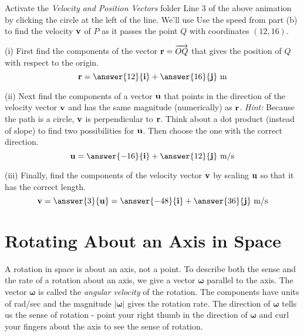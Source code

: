 \documentclass{ximera}
\begin{document}
\begin{question}   \label{Q3456457l:Cross}
Activate the {\it Velocity and Position Vectors} folder Line 3 of the above animation by clicking the circle at the left of the line. We'll use Use the speed from part (b) to find the velocity ${\bf v}$ of $P$ as it passes the point $Q$ with coordinates $(12,16)$.

(i) First find the components of the vector ${\bf r}=\overrightarrow{OQ}$ that gives the position of $Q$ with respect to the origin.
\[
    {\bf r} = \answer{12}{\bf i} + \answer{16}{\bf j} \text{ m}
\]

(ii) Next find the components of a vector ${\bf u}$ that points in the direction of the velocity vector ${\bf v}$ and has the same magnitude (numerically) as ${\bf r}$. {\it Hint:} Because the path is a circle, ${\bf v}$ is perpendicular to ${\bf r}$. Think about a dot product (instead of slope) to find two possibilities for ${\bf u}$. Then choose the one with the correct direction.
\[
    {\bf u} =  \answer{-16}{\bf i} + \answer{12}{\bf j} \text{ m/s}
\]

(iii) Finally, find the components of the velocity vector ${\bf v}$ by scaling ${\bf u}$ so that it has the correct length.
\[
     {\bf v} = \answer{3} {\bf u} = \answer{-48}{\bf i} + \answer{36}{\bf j} \text{ m/s}
\]


\end{question}  


 


\section{Rotating About an Axis in Space}
A rotation in space is about an axis, not a point. To describe both the sense and the rate of a rotation about an axis, we give a vector $\boldsymbol{\omega}$ parallel to the axis. The vector $\boldsymbol{\omega}$ is called the \emph{angular velocity} of the rotation. The components have units of rad/sec and the magnitude $|\boldsymbol{\omega}|$ gives the rotation rate. The direction of $\boldsymbol{\omega}$ tells us the sense of rotation - point your right thumb in the direction of $\boldsymbol{\omega}$ and curl your fingers about the axis to see the sense of rotation.
\end{document}
